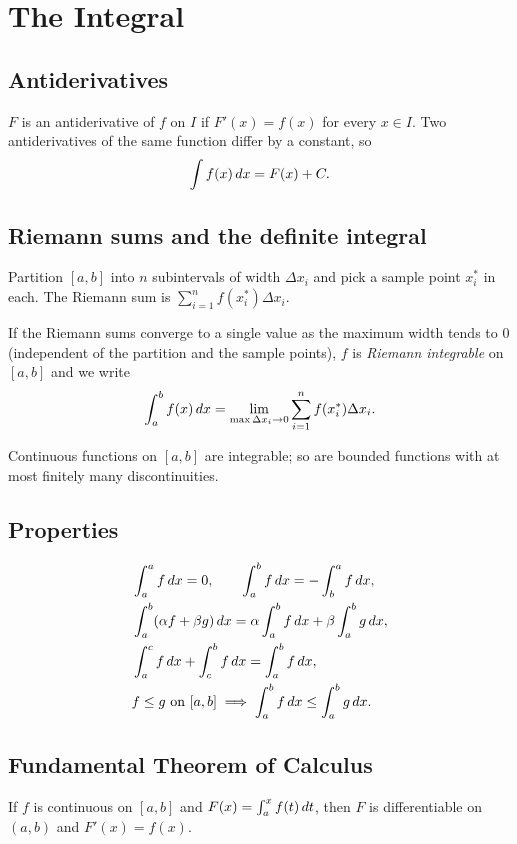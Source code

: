 \section{The Integral}

\subsection{Antiderivatives}
\begin{definition}
$F$ is an antiderivative of $f$ on $I$ if $F'(x) = f(x)$ for every $x \in I$.
Two antiderivatives of the same function differ by a constant, so
\[ \int f(x) \,dx = F(x) + C. \]
\end{definition}

\subsection{Riemann sums and the definite integral}
Partition $[a,b]$ into $n$ subintervals of width $\Delta x_i$ and pick a sample point
$x_i^*$ in each. The Riemann sum is $\sum_{i=1}^n f(x_i^*) \Delta x_i$.

\begin{definition}
If the Riemann sums converge to a single value as the maximum width tends to $0$
(independent of the partition and the sample points), $f$ is \emph{Riemann integrable} on
$[a,b]$ and we write
\[ \int_a^b f(x) \,dx = \lim_{\max \Delta x_i \to 0} \sum_{i=1}^n f(x_i^*) \Delta x_i. \]
\end{definition}

Continuous functions on $[a,b]$ are integrable; so are bounded functions with at most
finitely many discontinuities.

\subsection{Properties}
\[
\begin{aligned}
&\int_a^a f \,dx = 0, \qquad
\int_a^b f \,dx = -\int_b^a f \,dx, \\
&\int_a^b (\alpha f + \beta g) \,dx = \alpha \int_a^b f \,dx + \beta \int_a^b g \,dx, \\
&\int_a^c f \,dx + \int_c^b f \,dx = \int_a^b f \,dx, \\
&f \le g \text{ on } [a,b] \;\Longrightarrow\; \int_a^b f \,dx \le \int_a^b g \,dx.
\end{aligned}
\]

\subsection{Fundamental Theorem of Calculus}
\begin{theorem}
If $f$ is continuous on $[a,b]$ and $F(x) = \int_a^x f(t) \,dt$, then $F$ is differentiable on
$(a,b)$ and $F'(x) = f(x)$.
\end{theorem}


